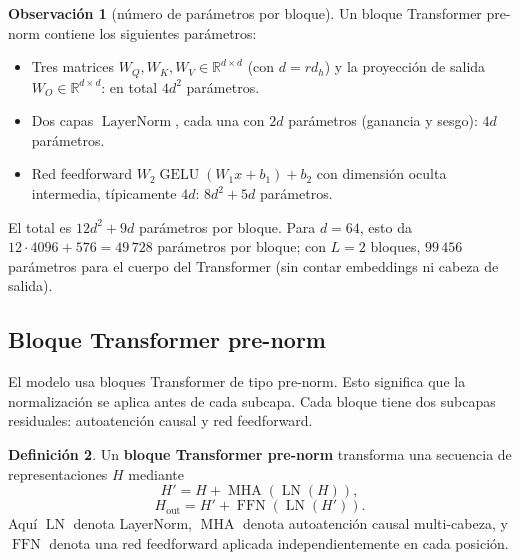 \documentclass[11pt]{report}
\newenvironment{tcolorbox}[1][]{\par\medskip\noindent\ignorespaces}{\par\medskip}
\theoremstyle{definition}
\newtheorem{definicion}{Definición}[section]
\newtheorem{observacion}[definicion]{Observación}
\theoremstyle{plain}
\numberwithin{equation}{section}
\newcommand{\R}{\mathbb{R}}
\newcommand{\LN}{\operatorname{LayerNorm}}
\newcommand{\GELU}{\operatorname{GELU}}
\begin{document}
\begin{observacion}[número de parámetros por bloque]
Un bloque Transformer pre-norm contiene los siguientes parámetros:
\begin{itemize}
    \item Tres matrices \(W_Q,W_K,W_V\in\R^{d\times d}\) (con \(d=r d_h\)) y la proyección de salida \(W_O\in\R^{d\times d}\): en total \(4d^2\) parámetros.
    \item Dos capas \(\LN\), cada una con \(2d\) parámetros (ganancia y sesgo): \(4d\) parámetros.
    \item Red feedforward \(W_2\GELU(W_1 x+b_1)+b_2\) con dimensión oculta intermedia, típicamente \(4d\): \(8d^2+5d\) parámetros.
\end{itemize}
El total es \(12d^2+9d\) parámetros por bloque. Para \(d=64\), esto da \(12\cdot 4096+576=49\,728\) parámetros por bloque; con \(L=2\) bloques, \(99\,456\) parámetros para el cuerpo del Transformer (sin contar embeddings ni cabeza de salida).
\end{observacion}

\subsection{Bloque Transformer pre-norm}

El modelo usa bloques Transformer de tipo pre-norm. Esto significa que la normalización se aplica antes de cada subcapa. Cada bloque tiene dos subcapas residuales: autoatención causal y red feedforward.

\begin{tcolorbox}[colback=blue!8, colframe=blue!8, boxrule=0pt]
\begin{definicion}
Un \textbf{bloque Transformer pre-norm} transforma una secuencia de representaciones \(H\) mediante
\begin{equation*}
    H'
    =
    H+\operatorname{MHA}(\operatorname{LN}(H)),
\end{equation*}
\begin{equation*}
    H_{\mathrm{out}}
    =
    H'
    +
    \operatorname{FFN}(\operatorname{LN}(H')).
\end{equation*}
Aquí \(\operatorname{LN}\) denota LayerNorm, \(\operatorname{MHA}\) denota autoatención causal multi-cabeza, y \(\operatorname{FFN}\) denota una red feedforward aplicada independientemente en cada posición.
\end{definicion}
\end{tcolorbox}
\end{document}
